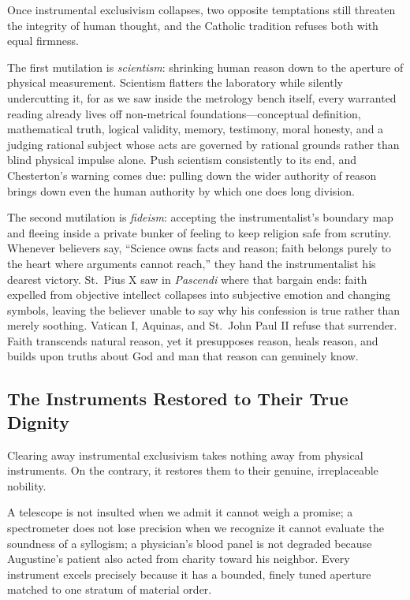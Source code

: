Once instrumental exclusivism collapses, two opposite temptations still threaten the integrity of human thought, and the Catholic tradition refuses both with equal firmness.

The first mutilation is \emph{scientism}: shrinking human reason down to the aperture of physical measurement. Scientism flatters the laboratory while silently undercutting it, for as we saw inside the metrology bench itself, every warranted reading already lives off non-metrical foundations---conceptual definition, mathematical truth, logical validity, memory, testimony, moral honesty, and a judging rational subject whose acts are governed by rational grounds rather than blind physical impulse alone. Push scientism consistently to its end, and Chesterton's warning comes due: pulling down the wider authority of reason brings down even the human authority by which one does long division.

The second mutilation is \emph{fideism}: accepting the instrumentalist's boundary map and fleeing inside a private bunker of feeling to keep religion safe from scrutiny. Whenever believers say, ``Science owns facts and reason; faith belongs purely to the heart where arguments cannot reach,'' they hand the instrumentalist his dearest victory. St.\ Pius X saw in \emph{Pascendi} where that bargain ends: faith expelled from objective intellect collapses into subjective emotion and changing symbols, leaving the believer unable to say why his confession is true rather than merely soothing. Vatican I, Aquinas, and St.\ John Paul II refuse that surrender. Faith transcends natural reason, yet it presupposes reason, heals reason, and builds upon truths about God and man that reason can genuinely know.

\subsection{The Instruments Restored to Their True Dignity}

Clearing away instrumental exclusivism takes nothing away from physical instruments. On the contrary, it restores them to their genuine, irreplaceable nobility.

A telescope is not insulted when we admit it cannot weigh a promise; a spectrometer does not lose precision when we recognize it cannot evaluate the soundness of a syllogism; a physician's blood panel is not degraded because Augustine's patient also acted from charity toward his neighbor. Every instrument excels precisely because it has a bounded, finely tuned aperture matched to one stratum of material order.

